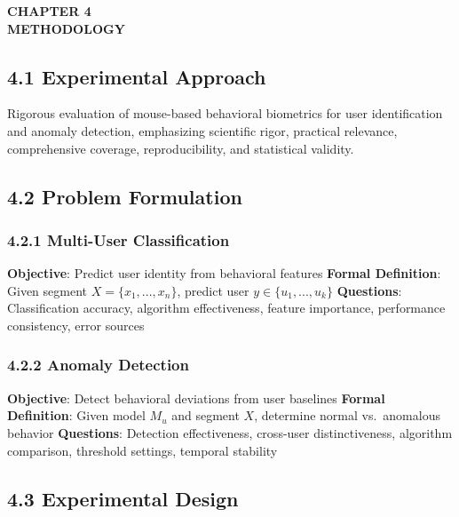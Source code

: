 \documentclass[
  11pt,
  a4paper,
]{article}
\begin{document}
\newpage

\newpage
\thispagestyle{plain}

\begin{center}
\vspace*{2cm}
\textbf{\Large CHAPTER 4}\\[0.5cm]
\textbf{\Large METHODOLOGY}
\end{center}

\newpage

\subsection{4.1 Experimental Approach}\label{experimental-approach}

Rigorous evaluation of mouse-based behavioral biometrics for user
identification and anomaly detection, emphasizing scientific rigor,
practical relevance, comprehensive coverage, reproducibility, and
statistical validity.

\subsection{4.2 Problem Formulation}\label{problem-formulation-1}

\subsubsection{4.2.1 Multi-User
Classification}\label{multi-user-classification}

\textbf{Objective}: Predict user identity from behavioral features
\textbf{Formal Definition}: Given segment \(X = \{x_1, ..., x_n\}\),
predict user \(y \in \{u_1, ..., u_k\}\) \textbf{Questions}:
Classification accuracy, algorithm effectiveness, feature importance,
performance consistency, error sources

\subsubsection{4.2.2 Anomaly Detection}\label{anomaly-detection}

\textbf{Objective}: Detect behavioral deviations from user baselines
\textbf{Formal Definition}: Given model \(M_u\) and segment \(X\),
determine normal vs.~anomalous behavior \textbf{Questions}: Detection
effectiveness, cross-user distinctiveness, algorithm comparison,
threshold settings, temporal stability

\subsection{4.3 Experimental Design}\label{experimental-design}
\end{document}
